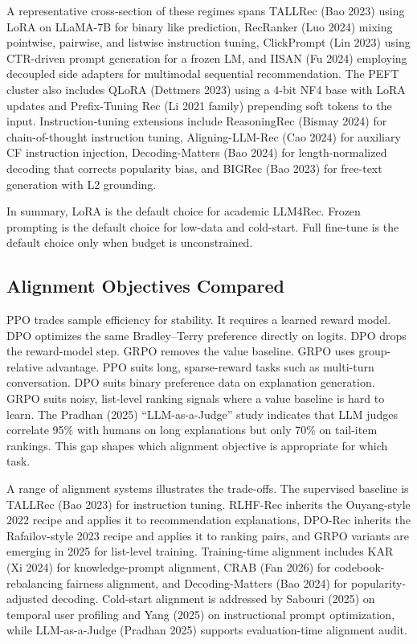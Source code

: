 A representative cross-section of these regimes spans TALLRec (Bao 2023) using LoRA on LLaMA-7B for binary like prediction, RecRanker (Luo 2024) mixing pointwise, pairwise, and listwise instruction tuning, ClickPrompt (Lin 2023) using CTR-driven prompt generation for a frozen LM, and IISAN (Fu 2024) employing decoupled side adapters for multimodal sequential recommendation. The PEFT cluster also includes QLoRA (Dettmers 2023) using a 4-bit NF4 base with LoRA updates and Prefix-Tuning Rec (Li 2021 family) prepending soft tokens to the input. Instruction-tuning extensions include ReasoningRec (Bismay 2024) for chain-of-thought instruction tuning, Aligning-LLM-Rec (Cao 2024) for auxiliary CF instruction injection, Decoding-Matters (Bao 2024) for length-normalized decoding that corrects popularity bias, and BIGRec (Bao 2023) for free-text generation with L2 grounding.

In summary, LoRA is the default choice for academic LLM4Rec. Frozen prompting is the default choice for low-data and cold-start. Full fine-tune is the default choice only when budget is unconstrained.

\subsection{Alignment Objectives Compared}\label{alignment-objectives-compared}

PPO trades sample efficiency for stability. It requires a learned reward model. DPO optimizes the same Bradley--Terry preference directly on logits. DPO drops the reward-model step. GRPO removes the value baseline. GRPO uses group-relative advantage. PPO suits long, sparse-reward tasks such as multi-turn conversation. DPO suits binary preference data on explanation generation. GRPO suits noisy, list-level ranking signals where a value baseline is hard to learn. The Pradhan (2025) ``LLM-as-a-Judge'' study indicates that LLM judges correlate 95\% with humans on long explanations but only 70\% on tail-item rankings. This gap shapes which alignment objective is appropriate for which task.

A range of alignment systems illustrates the trade-offs. The supervised baseline is TALLRec (Bao 2023) for instruction tuning. RLHF-Rec inherits the Ouyang-style 2022 recipe and applies it to recommendation explanations, DPO-Rec inherits the Rafailov-style 2023 recipe and applies it to ranking pairs, and GRPO variants are emerging in 2025 for list-level training. Training-time alignment includes KAR (Xi 2024) for knowledge-prompt alignment, CRAB (Fan 2026) for codebook-rebalancing fairness alignment, and Decoding-Matters (Bao 2024) for popularity-adjusted decoding. Cold-start alignment is addressed by Sabouri (2025) on temporal user profiling and Yang (2025) on instructional prompt optimization, while LLM-as-a-Judge (Pradhan 2025) supports evaluation-time alignment audit.

